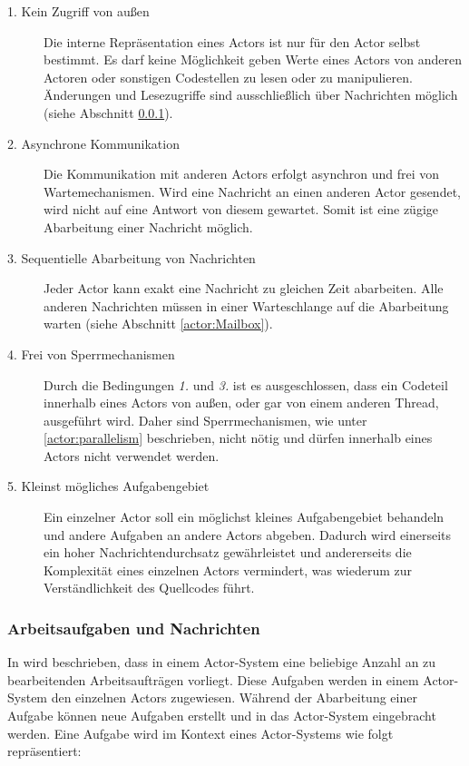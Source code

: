 \begin{description}
  \item[1. Kein Zugriff von außen]\label{actor:requirements:shareNothing}
  Die interne Repräsentation eines Actors ist nur für den Actor selbst bestimmt. Es darf keine Möglichkeit geben Werte eines Actors von anderen Actoren oder sonstigen Codestellen zu lesen oder zu manipulieren. Änderungen und Lesezugriffe sind ausschließlich über Nachrichten möglich (siehe Abschnitt \ref{sec:actors:messages}). 
  \item[2. Asynchrone Kommunikation]\label{actor:requirements:AsynchronCommunication}
  Die Kommunikation mit anderen Actors erfolgt asynchron und frei von Wartemechanismen. Wird eine Nachricht an einen anderen Actor gesendet, wird nicht auf eine Antwort von diesem gewartet. Somit ist eine zügige Abarbeitung einer Nachricht möglich.
  \item[3. Sequentielle Abarbeitung von Nachrichten]
  Jeder Actor kann exakt eine Nachricht zu gleichen Zeit abarbeiten. Alle anderen Nachrichten müssen in einer Warteschlange auf die Abarbeitung warten (siehe Abschnitt \ref{actor:Mailbox}).
  \item[4. Frei von Sperrmechanismen]
  Durch die Bedingungen \textit{1.} und \textit{3.} ist es ausgeschlossen, dass ein Codeteil innerhalb eines Actors von außen, oder gar von einem anderen Thread, ausgeführt wird. Daher sind Sperrmechanismen, wie unter \ref{actor:parallelism} beschrieben, nicht nötig und dürfen innerhalb eines Actors nicht verwendet werden.
  \item[5. Kleinst mögliches Aufgabengebiet]
  Ein einzelner Actor soll ein möglichst kleines Aufgabengebiet behandeln und andere Aufgaben an andere Actors abgeben. Dadurch wird einerseits ein hoher Nachrichtendurchsatz gewährleistet und andererseits die Komplexität eines einzelnen Actors vermindert, was wiederum zur Verständlichkeit des Quellcodes führt.
\end{description}

\subsubsection{Arbeitsaufgaben und Nachrichten}\label{sec:actors:messages}
In \cite{Agha1985ActorsSystems} wird beschrieben, dass in einem Actor-System eine beliebige Anzahl an zu bearbeitenden Arbeitsaufträgen vorliegt. Diese Aufgaben werden in einem Actor-System den einzelnen Actors zugewiesen. Während der Abarbeitung einer Aufgabe können neue Aufgaben erstellt und in das Actor-System eingebracht werden. Eine Aufgabe wird im Kontext eines Actor-Systems wie folgt repräsentiert:

